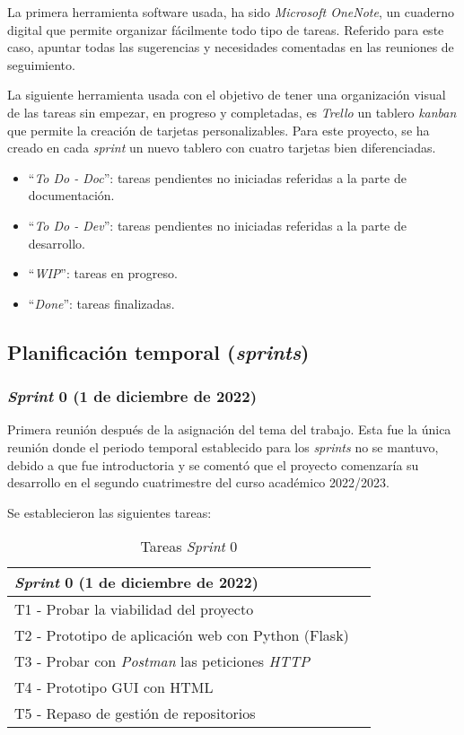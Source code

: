 La primera herramienta software usada, ha sido \textit{Microsoft OneNote}, un cuaderno digital que permite organizar fácilmente todo tipo de tareas. Referido para este caso, apuntar todas las sugerencias y necesidades comentadas en las reuniones de seguimiento.

La siguiente herramienta usada con el objetivo de tener una organización visual de las tareas sin empezar, en progreso y completadas, es \textit{Trello} un tablero \textit{kanban} que permite la creación de tarjetas personalizables. Para este proyecto, se ha creado en cada \textit{sprint} un nuevo tablero con cuatro tarjetas bien diferenciadas.

\begin{itemize}
    \item ``\textit{To Do - Doc}'': tareas pendientes no iniciadas referidas a la parte de documentación.
    \item ``\textit{To Do - Dev}'': tareas pendientes no iniciadas referidas a la parte de desarrollo.
    \item ``\textit{WIP}'': tareas en progreso.
    \item ``\textit{Done}'': tareas finalizadas.
\end{itemize}


\subsection{Planificación temporal (\textit{sprints})}
\subsubsection{\textit{Sprint} 0 (1 de diciembre de 2022)}
Primera reunión después de la asignación del tema del trabajo. Esta fue la única reunión donde el periodo temporal establecido para los \textit{sprints} no se mantuvo, debido a que fue introductoria y se comentó que el proyecto comenzaría su desarrollo en el segundo cuatrimestre del curso académico 2022/2023. 

Se establecieron las siguientes tareas:
\begin{table}[H]
\centering
\begin{tabular}{ll}
\toprule
\textit{Sprint} 0 (1 de diciembre  de 2022)   \\
\midrule
T1 - Probar la viabilidad del proyecto \\
T2 - Prototipo de aplicación web con Python (Flask)\\
T3 - Probar con \textit{Postman} las peticiones \textit{HTTP} \\
T4 - Prototipo GUI con HTML \\
T5 - Repaso de gestión de repositorios \\
\bottomrule
\end{tabular}
\caption{Tareas \textit{Sprint} 0}
\end{table}

